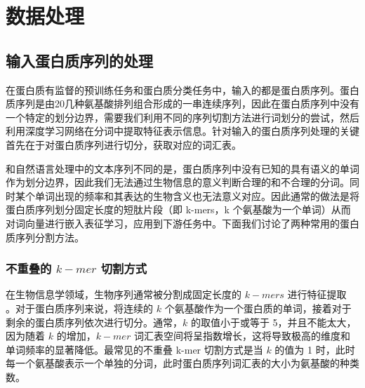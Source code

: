 \begin{table}[!htbp]
\centering
{}
 \label{table:4.1.2-3}
\end{table}


\section{数据处理}
\subsection{输入蛋白质序列的处理}
在蛋白质有监督的预训练任务和蛋白质分类任务中，输入的都是蛋白质序列。蛋白质序列是由20几种氨基酸排列组合形成的一串连续序列，因此在蛋白质序列中没有一个特定的划分边界，需要我们利用不同的序列切割方法进行词划分的尝试，然后利用深度学习网络在分词中提取特征表示信息。针对输入的蛋白质序列处理的关键首先在于对蛋白质序列进行切分，获取对应的词汇表。

和自然语言处理中的文本序列不同的是，蛋白质序列中没有已知的具有语义的单词作为划分边界，因此我们无法通过生物信息的意义判断合理的和不合理的分词。同时某个单词出现的频率和其表达的生物含义也无法意义对应。因此通常的做法是将蛋白质序列划分固定长度的短肽片段（即 k-mers，k 个氨基酸为一个单词）从而对词向量进行嵌入表征学习，应用到下游任务中。下面我们讨论了两种常用的蛋白质序列分割方法。

\subsubsection{不重叠的 $k-mer$ 切割方式}
在生物信息学领域，生物序列通常被分割成固定长度的 $k-mers$ 进行特征提取 \cite{asgari2015continuous, ofer2021language, yang2018learned, liu2019bioseq}。对于蛋白质序列来说，将连续的 $k$ 个氨基酸作为一个蛋白质的单词，接着对于剩余的蛋白质序列依次进行切分。通常，$k$ 的取值小于或等于 5，并且不能太大，因为随着 $k$ 的增加，$k-mer$ 词汇表空间将呈指数增长，这将导致极高的维度和单词频率的显著降低。最常见的不重叠 k-mer 切割方式是当 $k$ 的值为 1 时，此时每一个氨基酸表示一个单独的分词，此时蛋白质序列词汇表的大小为氨基酸的种类数。

